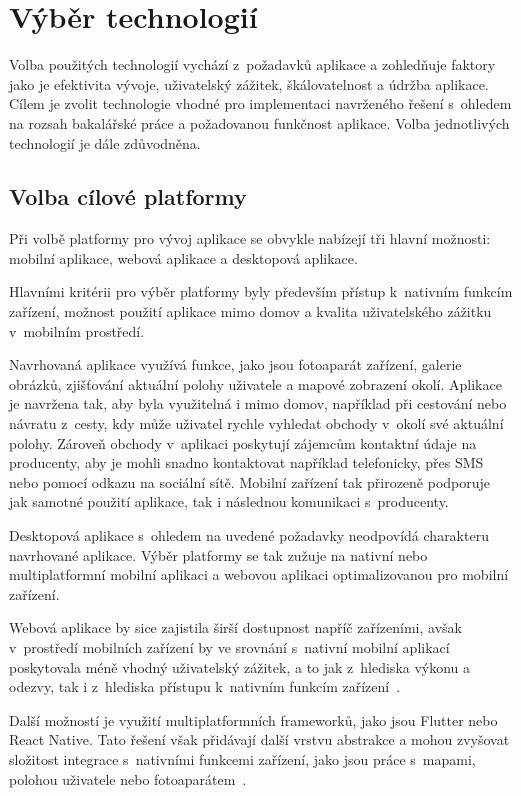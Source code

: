 \FloatBarrier


\section{Výběr technologií}
Volba použitých technologií vychází z~požadavků aplikace a zohledňuje faktory jako je efektivita vývoje, uživatelský zážitek, škálovatelnost a údržba aplikace.
Cílem je zvolit technologie vhodné pro implementaci navrženého řešení s~ohledem na rozsah bakalářské práce a požadovanou funkčnost aplikace.
Volba jednotlivých technologií je dále zdůvodněna.

\subsection{Volba cílové platformy}
Při volbě platformy pro vývoj aplikace se obvykle nabízejí tři hlavní možnosti: mobilní aplikace, webová aplikace a desktopová aplikace.

Hlavními kritérii pro výběr platformy byly především přístup k~nativním funkcím zařízení, možnost použití aplikace mimo domov a kvalita uživatelského zážitku v~mobilním prostředí.

Navrhovaná aplikace využívá funkce, jako jsou fotoaparát zařízení, galerie obrázků, zjišťování aktuální polohy uživatele a mapové zobrazení okolí.
Aplikace je navržena tak, aby byla využitelná i mimo domov, například při cestování nebo návratu z~cesty, kdy může uživatel rychle vyhledat obchody v~okolí své aktuální polohy.
Zároveň obchody v~aplikaci poskytují zájemcům kontaktní údaje na producenty, aby je mohli snadno kontaktovat například telefonicky, přes SMS nebo pomocí odkazu na sociální sítě.
Mobilní zařízení tak přirozeně podporuje jak samotné použití aplikace, tak i následnou komunikaci s~producenty.

Desktopová aplikace s~ohledem na uvedené požadavky neodpovídá charakteru navrhované aplikace.
Výběr platformy se tak zužuje na nativní nebo multiplatformní mobilní aplikaci a webovou aplikaci optimalizovanou pro mobilní zařízení.

Webová aplikace by sice zajistila širší dostupnost napříč zařízeními, avšak v~prostředí mobilních zařízení by ve srovnání s~nativní mobilní aplikací poskytovala méně vhodný uživatelský zážitek, a to jak z~hlediska výkonu a odezvy, tak i z~hlediska přístupu k~nativním funkcím zařízení~\parencite{horn_native_vs_web_app, aws_native_vs_web_app}.

Další možností je využití multiplatformních frameworků, jako jsou Flutter nebo React Native.
Tato řešení však přidávají další vrstvu abstrakce a mohou zvyšovat složitost integrace s~nativními funkcemi zařízení, jako jsou práce s~mapami, polohou uživatele nebo fotoaparátem~\parencite{native_vs_cross_platform}.

